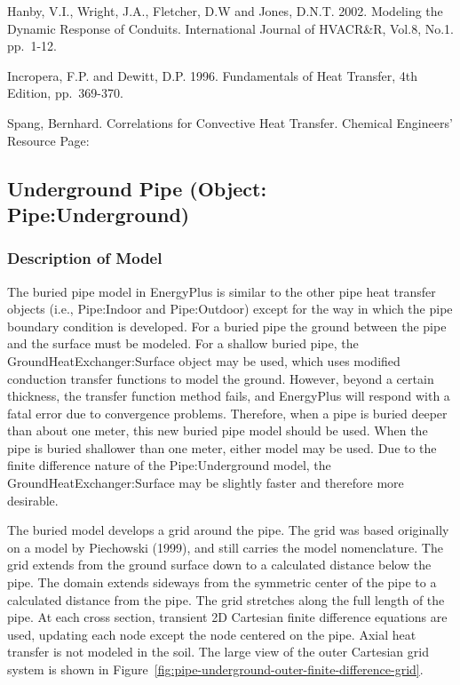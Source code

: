 Hanby, V.I., Wright, J.A., Fletcher, D.W and Jones, D.N.T. 2002. Modeling the Dynamic Response of Conduits. International Journal of HVACR\&R, Vol.8, No.1. pp.~1-12.

Incropera, F.P. and Dewitt, D.P. 1996. Fundamentals of Heat Transfer, 4th Edition, pp.~369-370.

Spang, Bernhard. Correlations for Convective Heat Transfer. Chemical Engineers' Resource Page:

\subsection{Underground Pipe (Object: Pipe:Underground)}\label{underground-pipe-object-pipeunderground}

\subsubsection{Description of Model}\label{description-of-model-000}

The buried pipe model in EnergyPlus is similar to the other pipe heat transfer objects (i.e., Pipe:Indoor and Pipe:Outdoor) except for the way in which the pipe boundary condition is developed. For a buried pipe the ground between the pipe and the surface must be modeled. For a shallow buried pipe, the GroundHeatExchanger:Surface object may be used, which uses modified conduction transfer functions to model the ground. However, beyond a certain thickness, the transfer function method fails, and EnergyPlus will respond with a fatal error due to convergence problems. Therefore, when a pipe is buried deeper than about one meter, this new buried pipe model should be used. When the pipe is buried shallower than one meter, either model may be used. Due to the finite difference nature of the Pipe:Underground model, the GroundHeatExchanger:Surface may be slightly faster and therefore more desirable.

The buried model develops a grid around the pipe. The grid was based originally on a model by Piechowski (1999), and still carries the model nomenclature. The grid extends from the ground surface down to a calculated distance below the pipe. The domain extends sideways from the symmetric center of the pipe to a calculated distance from the pipe. The grid stretches along the full length of the pipe. At each cross section, transient 2D Cartesian finite difference equations are used, updating each node except the node centered on the pipe. Axial heat transfer is not modeled in the soil. The large view of the outer Cartesian grid system is shown in Figure~\ref{fig:pipe-underground-outer-finite-difference-grid}.

